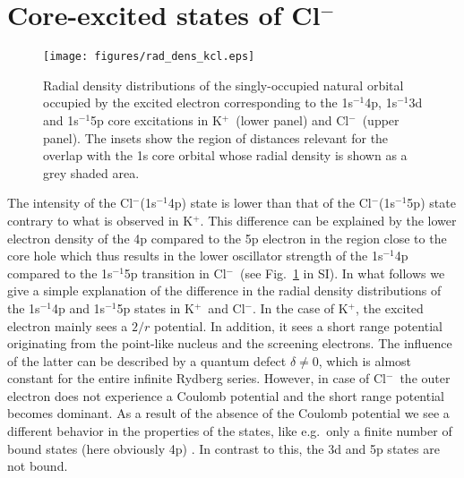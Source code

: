 \documentclass[journal=jpclcd,manuscript=letter]{achemso}
\newcommand{\cli}{Cl$^{-}$}
\newcommand{\ki}{K$^{+}$}
\begin{document}
\section{Core-excited states of Cl$^{-}$}
\begin{figure}[h!]
\centering
\texttt{[image: figures/rad\_dens\_kcl.eps]}
\caption{Radial density distributions of the singly-occupied natural orbital occupied by the excited electron corresponding to the 1s$^{-1}$4p, 1s$^{-1}$3d and 1s$^{-1}$5p core excitations in \ki~(lower panel) and \cli~(upper panel). The insets show the region of distances relevant for the overlap with the 1s core orbital whose radial density is shown as a grey shaded area.}
\label{fg:si_rdens_ions}
\end{figure}
%
%
The intensity of the Cl$^{-}$(1s$^{-1}$4p) state is lower than that of the \cli(1s$^{-1}$5p) state contrary to what is observed in \ki. This difference can be explained by the lower electron density of the 4p compared to the 5p electron in the region close to the core hole which thus results in the lower oscillator strength of the 1s$^{-1}$4p compared to the 1s$^{-1}$5p transition in \cli~(see Fig.\ \ref{fg:si_rdens_ions} in SI).
In what follows we give a simple explanation of the difference in the radial density distributions of the 1s$^{-1}$4p and 1s$^{-1}$5p states in \ki~and \cli. In the case of \ki, the excited electron mainly sees a $2/r$ potential. In addition, it sees a short range potential originating from the point-like nucleus and the screening electrons. The influence of the latter can be described by a quantum defect $\delta \ne 0$, which is almost constant for the entire infinite Rydberg series. However, in case of \cli~the outer electron does not experience a Coulomb potential and the short range potential becomes dominant. As a result of the absence of the Coulomb potential we see a different behavior in the properties of the states, like e.g.\ only a finite number of bound states (here obviously 4p) \citep{buckman94:539}. In contrast to this, the 3d and 5p states are not bound. %
\end{document}

